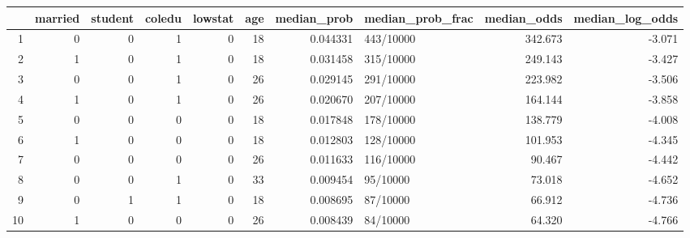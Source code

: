 \begin{table}[ht]
\centering
\begin{tabular}{rrrrrrrlrr}
  \hline
 & married & student & coledu & lowstat & age & median\_prob & median\_prob\_frac & median\_odds & median\_log\_odds \\ 
  \hline
1 &       0 &       0 &       1 &       0 &      18 & 0.044331 & 443/10000 & 342.673 & -3.071 \\ 
  2 &       1 &       0 &       1 &       0 &      18 & 0.031458 & 315/10000 & 249.143 & -3.427 \\ 
  3 &       0 &       0 &       1 &       0 &      26 & 0.029145 & 291/10000 & 223.982 & -3.506 \\ 
  4 &       1 &       0 &       1 &       0 &      26 & 0.020670 & 207/10000 & 164.144 & -3.858 \\ 
  5 &       0 &       0 &       0 &       0 &      18 & 0.017848 & 178/10000 & 138.779 & -4.008 \\ 
  6 &       1 &       0 &       0 &       0 &      18 & 0.012803 & 128/10000 & 101.953 & -4.345 \\ 
  7 &       0 &       0 &       0 &       0 &      26 & 0.011633 & 116/10000 & 90.467 & -4.442 \\ 
  8 &       0 &       0 &       1 &       0 &      33 & 0.009454 & 95/10000 & 73.018 & -4.652 \\ 
  9 &       0 &       1 &       1 &       0 &      18 & 0.008695 & 87/10000 & 66.912 & -4.736 \\ 
  10 &       1 &       0 &       0 &       0 &      26 & 0.008439 & 84/10000 & 64.320 & -4.766 \\ 
   \hline
\end{tabular}
\end{table}

